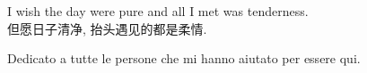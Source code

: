 
\cleardoublepage
{}
\thispagestyle{empty}

\vspace*{3cm}

\begin{center}
    I wish the day were pure and all I met was tenderness.\\ \medskip
    但愿日子清净, 抬头遇见的都是柔情.\\ \medskip
\end{center}

\medskip

\begin{center}
Dedicato a tutte le persone che mi hanno aiutato per essere qui.
\end{center}
